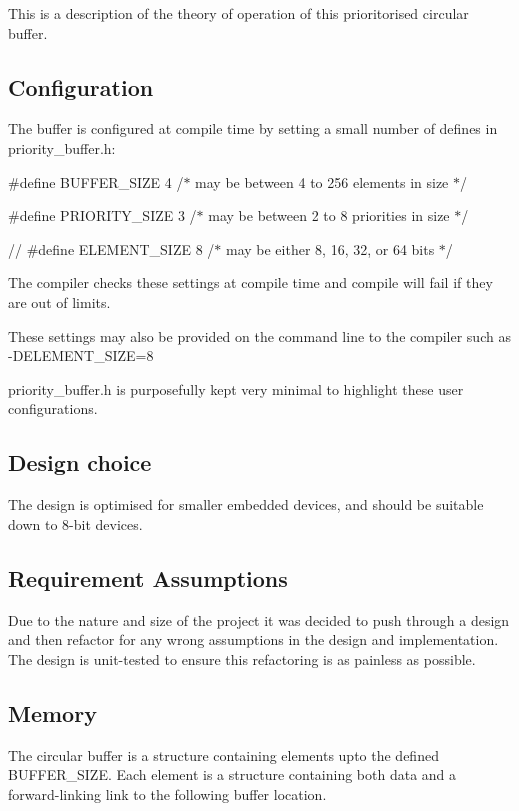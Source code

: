 This is a description of the theory of operation of this prioritorised circular buffer.

\subsection*{Configuration}

The buffer is configured at compile time by setting a small number of defines in priority\+\_\+buffer.\+h\+:

\#define B\+U\+F\+F\+E\+R\+\_\+\+S\+I\+ZE 4 /$\ast$ may be between 4 to 256 elements in size $\ast$/

\#define P\+R\+I\+O\+R\+I\+T\+Y\+\_\+\+S\+I\+ZE 3 /$\ast$ may be between 2 to 8 priorities in size $\ast$/

// \#define E\+L\+E\+M\+E\+N\+T\+\_\+\+S\+I\+ZE 8 /$\ast$ may be either 8, 16, 32, or 64 bits $\ast$/

The compiler checks these settings at compile time and compile will fail if they are out of limits.

These settings may also be provided on the command line to the compiler such as -\/\+D\+E\+L\+E\+M\+E\+N\+T\+\_\+\+S\+I\+ZE=8

priority\+\_\+buffer.\+h is purposefully kept very minimal to highlight these user configurations.

\subsection*{Design choice}

The design is optimised for smaller embedded devices, and should be suitable down to 8-\/bit devices.

\subsection*{Requirement Assumptions}

Due to the nature and size of the project it was decided to push through a design and then refactor for any wrong assumptions in the design and implementation. The design is unit-\/tested to ensure this refactoring is as painless as possible.

\subsection*{Memory}

The circular buffer is a structure containing elements upto the defined B\+U\+F\+F\+E\+R\+\_\+\+S\+I\+ZE. Each element is a structure containing both data and a forward-\/linking link to the following buffer location.

